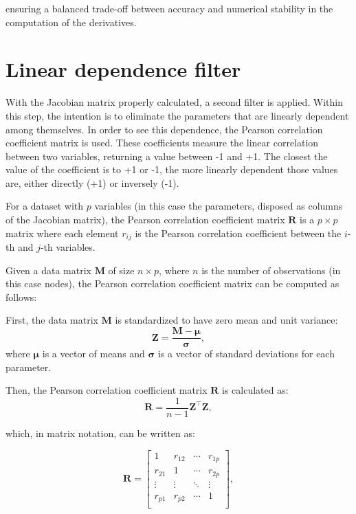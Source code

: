  ensuring a balanced trade-off between accuracy and numerical stability in the computation of the derivatives.

 \section{Linear dependence filter}\label{s:ldfilter}
With the Jacobian matrix properly calculated, a second filter is applied. Within this step, the intention is to eliminate the parameters that are linearly dependent among themselves. In order to see this dependence, the Pearson correlation coefficient matrix is used. These coefficients measure the linear correlation between two variables, returning a value between -1 and +1. The closest the value of the coefficient is to +1 or -1, the more linearly dependent those values are, either directly (+1) or inversely (-1).

For a dataset with \( p \) variables (in this case the parameters, disposed as columns of the Jacobian matrix), the Pearson correlation coefficient matrix \( \mathbf{R} \) is a \( p \times p \) matrix where each element \( r_{ij} \) is the Pearson correlation coefficient between the \( i \)-th and \( j \)-th variables.

Given a data matrix \( \mathbf{M} \) of size \( n \times p \), where \( n \) is the number of observations (in this case nodes), the Pearson correlation coefficient matrix can be computed as follows:

First, the data matrix \( \mathbf{M} \) is standardized to have zero mean and unit variance:
   \[
   \mathbf{Z} = \frac{\mathbf{M} - \mathbf{\mu}}{\mathbf{\sigma}},
   \]
where \( \mathbf{\mu} \) is a vector of means and \( \mathbf{\sigma} \) is a vector of standard deviations for each parameter.

Then, the Pearson correlation coefficient matrix \( \mathbf{R} \) is calculated as:
   \[
   \mathbf{R} = \frac{1}{n-1} \mathbf{Z}^\top \mathbf{Z}, 
   \]

which, in matrix notation, can be written as:

\[
\mathbf{R} = \left[ \begin{array}{cccc}
1 & r_{12} & \cdots & r_{1p} \\
r_{21} & 1 & \cdots & r_{2p} \\
\vdots & \vdots & \ddots & \vdots \\
r_{p1} & r_{p2} & \cdots & 1 \\
\end{array} \right],
\]

